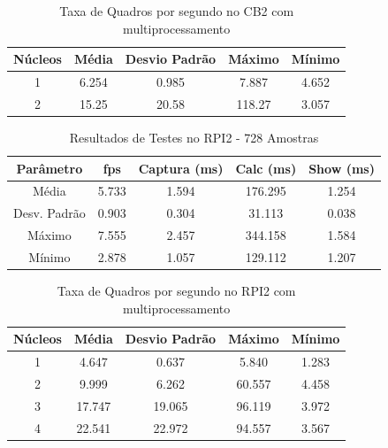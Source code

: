 \documentclass[conference]{IEEEtran}
\begin{document}
\begin{table}[h]\centering
\renewcommand{\arraystretch}{1.75}
\caption{Taxa de Quadros por segundo no CB2 com multiprocessamento}
\label{tab:table_cb2_cores_fps}
\begin{tabular}{|c|c|c|c|c|}

\hline
\textbf{Núcleos} & \textbf{Média} & \textbf{Desvio Padrão} & \textbf{Máximo} & \textbf{Mínimo} \\\hline \hline
1		& 6.254		& 0.985		&	7.887	&	4.652	\\ \hline
2		& 15.25		& 20.58		&	118.27	&	3.057	\\ \hline

\end{tabular}
\end{table}

\begin{table}[h]\centering
\renewcommand{\arraystretch}{1.75}
\caption{Resultados de Testes no RPI2 - 728 Amostras}
\label{tab:table_rpi}
\begin{tabular}{|c|c|c|c|c|}

\hline
\textbf{Parâmetro} & \textbf{fps} & \textbf{Captura (ms)} & \textbf{Calc (ms)} & \textbf{Show (ms)} \\\hline \hline
Média			& 5.733 & 1.594	&	176.295	&	1.254	\\ \hline
Desv. Padrão	& 0.903 & 0.304	&	31.113	&	0.038	\\ \hline
Máximo			& 7.555 & 2.457 &	344.158	&	1.584	\\ \hline
Mínimo			& 2.878 & 1.057 &	129.112	&	1.207	\\ \hline

\end{tabular}
\end{table}

\begin{table}[h]\centering
\renewcommand{\arraystretch}{1.75}
\caption{Taxa de Quadros por segundo no RPI2 com multiprocessamento}
\label{tab:table_rpi_cores_fps}
\begin{tabular}{|c|c|c|c|c|}

\hline
\textbf{Núcleos} & \textbf{Média} & \textbf{Desvio Padrão} & \textbf{Máximo} & \textbf{Mínimo} \\\hline \hline
1		& 4.647		& 0.637		&	5.840	&	1.283	\\ \hline
2		& 9.999		& 6.262		&	60.557	&	4.458	\\ \hline
3		& 17.747	& 19.065 	&	96.119	&	3.972	\\ \hline
4		& 22.541	& 22.972	&	94.557	&	3.567	\\ \hline

\end{tabular}
\end{table}
\end{document}
